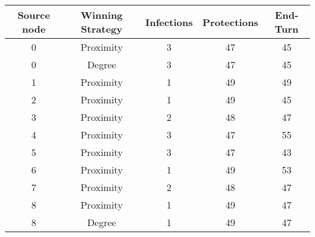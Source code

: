 \documentclass[results.tex]{subfiles}
\begin{document}
    \begin{center}
        \begin{tabular}{| c || c | c | c | c |}
            \hline
            {\bfseries Source node} & {\bfseries Winning Strategy} & {\bfseries Infections} & {\bfseries Protections}
            & {\bfseries End-Turn}
            \\  %
            \hline\hline
            0                       & Proximity                    & 3                      & 47                      & 45                   \\
            \hline
            0                       & Degree                       & 3                      & 47                      & 45                   \\
            \hline
            1                       & Proximity                    & 1                      & 49                      & 49                   \\
            \hline
            2                       & Proximity                    & 1                      & 49                      & 45                   \\
            \hline
            3                       & Proximity                    & 2                      & 48                      & 47                   \\
            \hline
            4                       & Proximity                    & 3                      & 47                      & 55                   \\
            \hline
            5                       & Proximity                    & 3                      & 47                      & 43                   \\
            \hline
            6                       & Proximity                    & 1                      & 49                      & 53                   \\
            \hline
            7                       & Proximity                    & 2                      & 48                      & 47                   \\
            \hline
            8                       & Proximity                    & 1                      & 49                      & 47                   \\
            \hline
            8                       & Degree                       & 1                      & 49                      & 47                   \\

\end{tabular}
\end{center}
\end{document}
